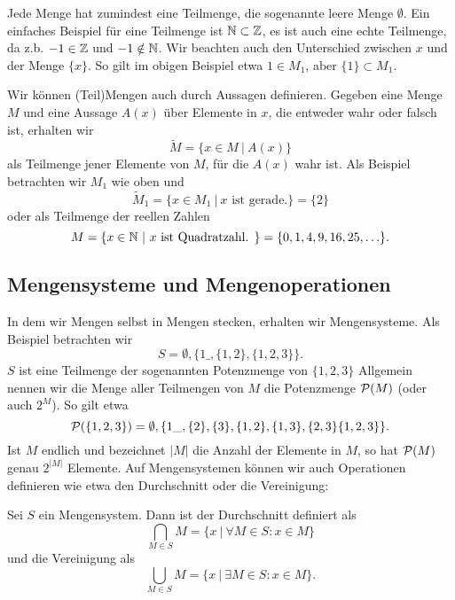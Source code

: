 Jede Menge hat zumindest eine Teilmenge, die sogenannte leere Menge \(\emptyset\). Ein einfaches Beispiel für eine Teilmenge ist \(\mathbb{N} \subset \mathbb{Z}\), es ist auch eine echte Teilmenge, da z.b. \(-1 \in \mathbb{Z}\) und \(-1 \notin \mathbb{N}\).
Wir beachten auch den Unterschied zwischen \(x\) und der Menge \(\{x\}\). So gilt im obigen Beispiel etwa \(1 \in M_1\), aber \(\{1\} \subset M_1\).

Wir können (Teil)Mengen auch durch Aussagen definieren. Gegeben eine Menge \(M\) und eine Aussage \(A(x)\) über Elemente in \(x\), die entweder wahr oder falsch ist, erhalten wir
\begin{equation*}
 \tilde M = \{ x\in M ~|~A(x)\}
\end{equation*}
als Teilmenge jener Elemente von \(M\), für die \(A(x)\) wahr ist. Als Beispiel betrachten wir \(M_1\) wie oben und
\begin{equation*}
 \tilde M_1 = \{x \in M_1 ~|~x \text{ ist gerade.}\} = \{2\}
\end{equation*}
oder als Teilmenge der reellen Zahlen
\begin{equation*}
 M = \{ x \in \mathbb{N}~|~x \text{ ist Quadratzahl. }\} = \{0,1,4,9,16,25,\ldots\}.
\end{equation*}

\subsection{Mengensysteme und Mengenoperationen}
\label{\detokenize{grundlagen/mengenlogik:mengensysteme-und-mengenoperationen}}
In dem wir Mengen selbst in Mengen stecken, erhalten wir Mengensysteme. Als Beispiel betrachten wir
\begin{equation*}
 S = \emptyset,\{1\_,\{1,2\},\{1,2,3\} \}.
\end{equation*}
\(S\) ist eine Teilmenge der sogenannten Potenzmenge von \(\{1,2,3\}\) Allgemein nennen wir die Menge aller Teilmengen von \(M\) die Potenzmenge \({\cal P}(M)\) (oder auch \(2^M\)). So gilt etwa
\begin{equation*}
 {\cal P}(\{1,2,3\}) = \emptyset,\{1\_,\{2\},\{3\},\{1,2\},\{1,3\},\{2,3\}\{1,2,3\} \}.
\end{equation*}
Ist \(M\) endlich und bezeichnet \(\vert M \vert\) die Anzahl der Elemente in \(M\), so hat \({\cal P}(M)\) genau \(2^{\vert M \vert}\) Elemente.
Auf Mengensystemen können wir auch Operationen definieren wie etwa den Durchschnitt oder die Vereinigung:
\label{grundlagen/mengenlogik:definition-1}
\begin{definition}{}{}



Sei \(S\) ein Mengensystem. Dann ist der Durchschnitt definiert als
\begin{equation*}
 \bigcap_{M \in S} M = \{x ~|~ \forall M \in S: x \in M \}
\end{equation*}
und die Vereinigung als
\begin{equation*}
 \bigcup_{M \in S} M = \{x ~|~ \exists M \in S: x \in M \}.
\end{equation*}\end{definition}

